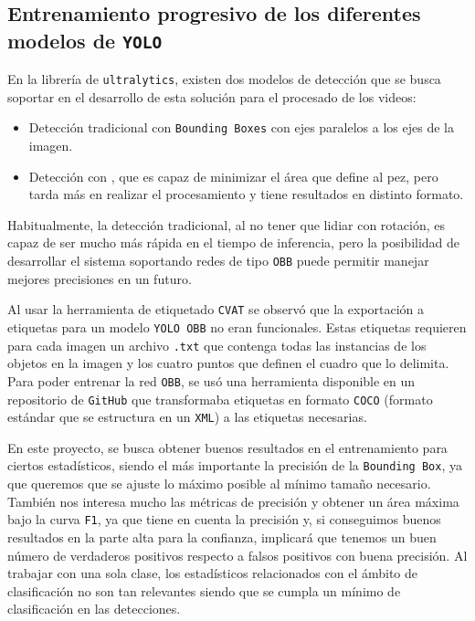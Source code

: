 \clearpage
\subsection{Entrenamiento progresivo de los diferentes modelos de \texttt{YOLO}}

En la librería de \texttt{ultralytics}, existen dos modelos de detección que se busca soportar en el desarrollo de esta solución para el procesado de los videos:

\begin{itemize}
    \item Detección tradicional con \texttt{Bounding Boxes} con ejes paralelos a los ejes de la imagen.
    \item Detección con , que es capaz de minimizar el área que define al pez, pero tarda más en realizar el procesamiento y tiene resultados en distinto formato.
\end{itemize}

Habitualmente, la detección tradicional, al no tener que lidiar con rotación, es capaz de ser mucho más rápida en el tiempo de inferencia, pero la posibilidad de desarrollar el sistema soportando redes de tipo \texttt{OBB} 
puede permitir manejar mejores precisiones en un futuro.

Al usar la herramienta de etiquetado \texttt{CVAT} se observó que la exportación a etiquetas para un modelo \texttt{YOLO OBB} no eran funcionales. Estas etiquetas requieren para cada imagen un archivo \texttt{.txt} que contenga 
todas las instancias de los objetos en la imagen y los cuatro puntos que definen el cuadro que lo delimita.\newline
Para poder entrenar la red \texttt{OBB}, se usó una herramienta disponible en un repositorio de \texttt{GitHub}\cite{kolesnikovKoldim2001COCO_to_YOLOv82024} que transformaba etiquetas en formato \texttt{COCO} (formato estándar 
que se estructura en un \texttt{XML}) a las etiquetas necesarias. 

En este proyecto, se busca obtener buenos resultados en el entrenamiento para ciertos estadísticos, siendo el más importante la precisión de la \texttt{Bounding Box}, ya que queremos que se ajuste lo máximo posible al mínimo tamaño 
necesario. También nos interesa mucho las métricas de precisión y obtener un área máxima bajo la curva \texttt{F1}, ya que tiene en cuenta la precisión y, si conseguimos buenos resultados en la parte alta para la confianza, implicará 
que tenemos un buen número de verdaderos positivos respecto a falsos positivos con buena precisión. Al trabajar con una sola clase, los estadísticos relacionados con el ámbito de clasificación no son tan relevantes siendo que se 
cumpla un mínimo de clasificación en las detecciones.

